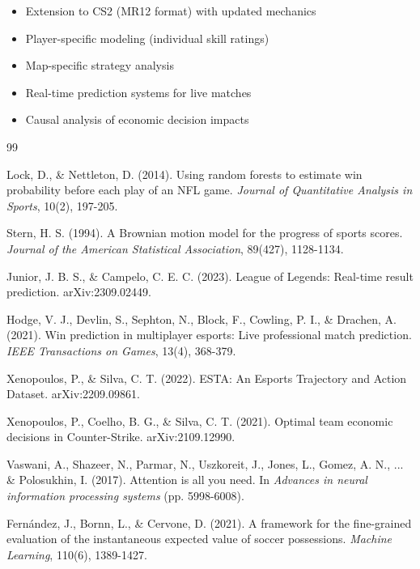 \documentclass[11pt]{article}
\begin{document}
\begin{itemize}
    \item Extension to CS2 (MR12 format) with updated mechanics
    \item Player-specific modeling (individual skill ratings)
    \item Map-specific strategy analysis
    \item Real-time prediction systems for live matches
    \item Causal analysis of economic decision impacts
\end{itemize}

\clearpage


\begin{thebibliography}{99}

Lock, D., \& Nettleton, D. (2014). Using random forests to estimate win probability before each play of an NFL game. \textit{Journal of Quantitative Analysis in Sports}, 10(2), 197-205.

Stern, H. S. (1994). A Brownian motion model for the progress of sports scores. \textit{Journal of the American Statistical Association}, 89(427), 1128-1134.

Junior, J. B. S., \& Campelo, C. E. C. (2023). League of Legends: Real-time result prediction. arXiv:2309.02449.

Hodge, V. J., Devlin, S., Sephton, N., Block, F., Cowling, P. I., \& Drachen, A. (2021). Win prediction in multiplayer esports: Live professional match prediction. \textit{IEEE Transactions on Games}, 13(4), 368-379.


Xenopoulos, P., \& Silva, C. T. (2022). ESTA: An Esports Trajectory and Action Dataset. arXiv:2209.09861.

Xenopoulos, P., Coelho, B. G., \& Silva, C. T. (2021). Optimal team economic decisions in Counter-Strike. arXiv:2109.12990.

Vaswani, A., Shazeer, N., Parmar, N., Uszkoreit, J., Jones, L., Gomez, A. N., ... \& Polosukhin, I. (2017). Attention is all you need. In \textit{Advances in neural information processing systems} (pp. 5998-6008).

Fernández, J., Bornn, L., \& Cervone, D. (2021). A framework for the fine-grained evaluation of the instantaneous expected value of soccer possessions. \textit{Machine Learning}, 110(6), 1389-1427.


\end{thebibliography}
\end{document}
